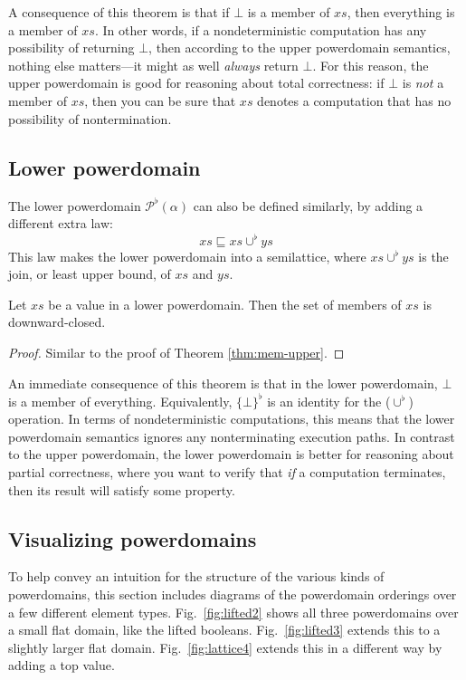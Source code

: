 A consequence of this theorem is that if $\bot$ is a member of $xs$, then everything is a member of $xs$. In other words, if a nondeterministic computation has any possibility of returning $\bot$, then according to the upper powerdomain semantics, nothing else matters---it might as well \emph{always} return $\bot$. For this reason, the upper powerdomain is good for reasoning about total correctness: if $\bot$ is \emph{not} a member of $xs$, then you can be sure that $xs$ denotes a computation that has no possibility of nontermination.

\subsection{Lower powerdomain}

The lower powerdomain $\mathcal{P}^{\flat}(\alpha)$ can also be defined similarly, by adding a different extra law:
\begin{equation}
xs\sqsubseteq xs\cup^{\flat}ys
\label{eq:lower-plus}
\end{equation}
This law makes the lower powerdomain into a semilattice, where $xs\cup^{\flat}ys$ is the join, or least upper bound, of $xs$ and $ys$.

\begin{theorem}
\label{thm:mem-lower}Let $xs$ be a value in a lower powerdomain. Then the set of members of $xs$ is downward-closed.
\end{theorem}
\begin{proof}
Similar to the proof of Theorem \ref{thm:mem-upper}.
\end{proof}
An immediate consequence of this theorem is that in the lower powerdomain, $\bot$ is a member of everything. Equivalently, $\{\bot\}^{\flat}$ is an identity for the ($\cup^{\flat}$) operation. In terms of nondeterministic computations, this means that the lower powerdomain semantics ignores any nonterminating execution paths. In contrast to the upper powerdomain, the lower powerdomain is better for reasoning about partial correctness, where you want to verify that \emph{if} a computation terminates, then its result will satisfy some property.


\subsection{Visualizing powerdomains}

To help convey an intuition for the structure of the various kinds of powerdomains, this section includes diagrams of the powerdomain orderings over a few different element types. Fig.~\ref{fig:lifted2} shows all three powerdomains over a small flat domain, like the lifted booleans. Fig.~\ref{fig:lifted3} extends this to a slightly larger flat domain. Fig.~\ref{fig:lattice4} extends this in a different way by adding a top value.

